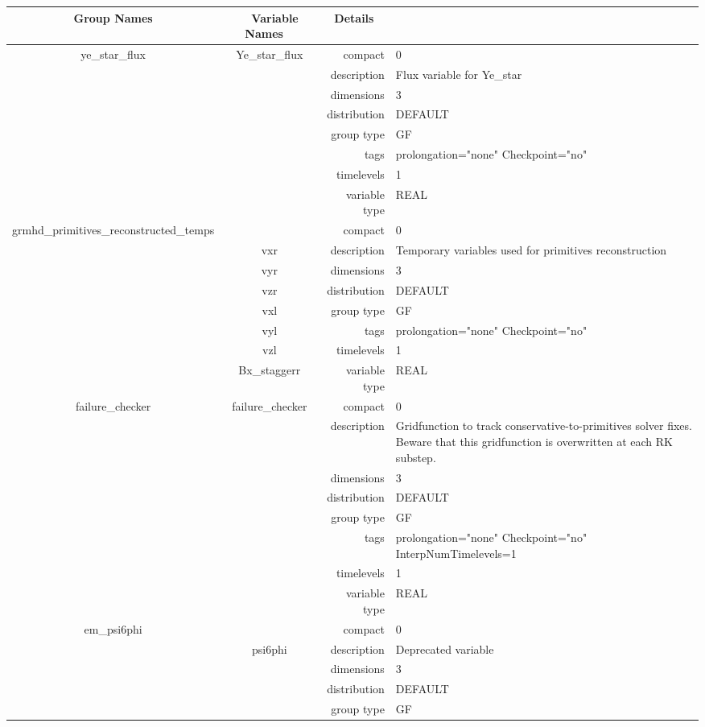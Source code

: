 \begin{tabular*}{150mm}{|c|c@{\extracolsep{\fill}}|rl|} \hline 
~ {\bf Group Names} ~ & ~ {\bf Variable Names} ~  &{\bf Details} ~ & ~ \\ 
\hline 
ye\_star\_flux & Ye\_star\_flux & compact & 0 \\ 
 &  & description & Flux variable for Ye\_star \\ 
 &  & dimensions & 3 \\ 
 &  & distribution & DEFAULT \\ 
 &  & group type & GF \\ 
 &  & tags & prolongation="none" Checkpoint="no" \\ 
 &  & timelevels & 1 \\ 
 &  & variable type & REAL \\ 
\hline 
grmhd\_primitives\_reconstructed\_temps &  & compact & 0 \\ 
 & vxr & description & Temporary variables used for primitives reconstruction \\ 
 & vyr & dimensions & 3 \\ 
 & vzr & distribution & DEFAULT \\ 
 & vxl & group type & GF \\ 
 & vyl & tags & prolongation="none" Checkpoint="no" \\ 
 & vzl & timelevels & 1 \\ 
 & Bx\_staggerr & variable type & REAL \\ 
\hline 
failure\_checker & failure\_checker & compact & 0 \\ 
 &  & description & Gridfunction to track conservative-to-primitives solver fixes. Beware that this gridfunction is overwritten at each RK substep. \\ 
 &  & dimensions & 3 \\ 
 &  & distribution & DEFAULT \\ 
 &  & group type & GF \\ 
 &  & tags & prolongation="none" Checkpoint="no" InterpNumTimelevels=1 \\ 
 &  & timelevels & 1 \\ 
 &  & variable type & REAL \\ 
\hline 
em\_psi6phi &  & compact & 0 \\ 
 & psi6phi & description & Deprecated variable \\ 
 &  & dimensions & 3 \\ 
 &  & distribution & DEFAULT \\ 
 &  & group type & GF \\ 

\end{tabular*}
